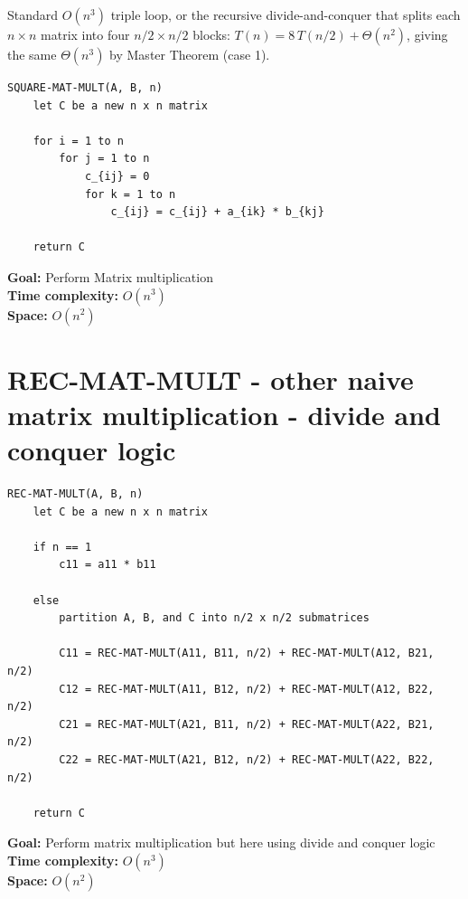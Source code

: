 \documentclass[11pt,a4paper,openany]{book}
\begin{document}
Standard $O(n^3)$ triple loop, or the recursive divide-and-conquer that splits each
$n \times n$ matrix into four $n/2 \times n/2$ blocks: $T(n) = 8\,T(n/2) + \Theta(n^2)$,
giving the same $\Theta(n^3)$ by Master Theorem (case 1).


\begin{lstlisting}
SQUARE-MAT-MULT(A, B, n)
    let C be a new n x n matrix

    for i = 1 to n
        for j = 1 to n
            c_{ij} = 0
            for k = 1 to n
                c_{ij} = c_{ij} + a_{ik} * b_{kj}

    return C
\end{lstlisting}

\textbf{Goal:} Perform Matrix multiplication \\
\textbf{Time complexity:} $O(n^3)$ \\
\textbf{Space:} $O(n^2)$



\vspace{2cm}


\section{REC-MAT-MULT - other naive matrix multiplication - divide and conquer logic}

\begin{lstlisting}
REC-MAT-MULT(A, B, n)
    let C be a new n x n matrix

    if n == 1
        c11 = a11 * b11

    else
        partition A, B, and C into n/2 x n/2 submatrices

        C11 = REC-MAT-MULT(A11, B11, n/2) + REC-MAT-MULT(A12, B21, n/2)
        C12 = REC-MAT-MULT(A11, B12, n/2) + REC-MAT-MULT(A12, B22, n/2)
        C21 = REC-MAT-MULT(A21, B11, n/2) + REC-MAT-MULT(A22, B21, n/2)
        C22 = REC-MAT-MULT(A21, B12, n/2) + REC-MAT-MULT(A22, B22, n/2)

    return C
\end{lstlisting}

\textbf{Goal:} Perform matrix multiplication but here using divide and conquer logic\\
\textbf{Time complexity:} $O(n^3)$ \\
\textbf{Space:} $O(n^2)$








\vspace{2cm}
\end{document}

